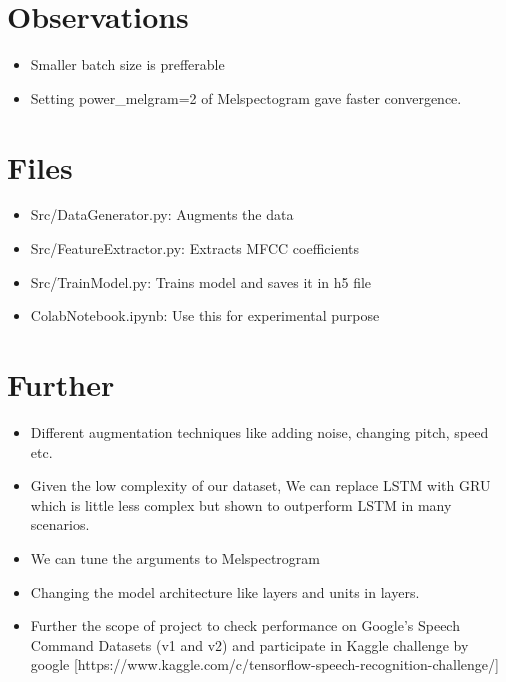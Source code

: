\documentclass[11pt,english]{article}
\begin{document}
 
\section{Observations}
\begin{itemize}
    \item Smaller batch size is prefferable
    \item Setting power\_melgram=2 of Melspectogram gave faster convergence.
\end{itemize}
\section{Files}
\begin{itemize}
    \item Src/DataGenerator.py: Augments the data
    \item Src/FeatureExtractor.py: Extracts MFCC coefficients
    \item Src/TrainModel.py: Trains model and saves it in h5 file
    \item ColabNotebook.ipynb: Use this for experimental purpose
\end{itemize}

\section{Further}
\begin{itemize}
    \item Different augmentation techniques like adding noise, changing pitch, speed etc.
    \item Given the low complexity of our dataset, We can replace LSTM with GRU which is little less complex but shown to outperform LSTM in many scenarios. 
    \item We can tune the arguments to Melspectrogram 
    \item Changing the model architecture like layers and units in layers.
    \item Further the scope of project to check performance on Google’s Speech Command Datasets (v1 and v2) and participate in Kaggle challenge by google
[https://www.kaggle.com/c/tensorflow-speech-recognition-challenge/]

\end{itemize}
\end{document}
